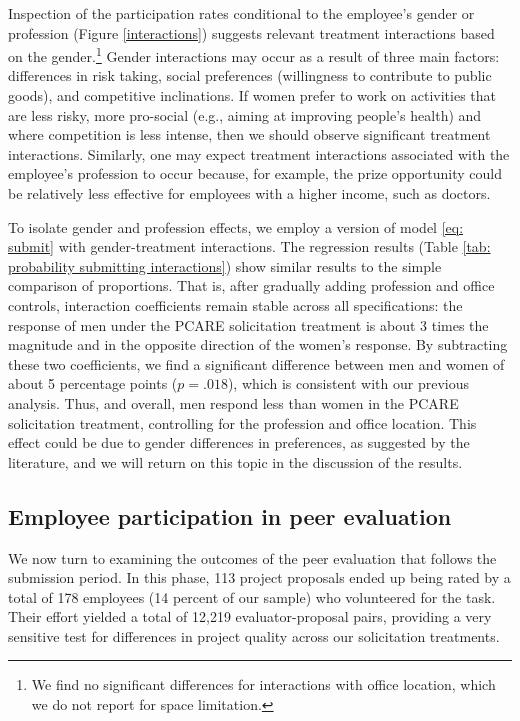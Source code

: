 \documentclass[11pt]{article}
\begin{document}
Inspection of the participation rates conditional to the employee's
gender or profession (Figure \ref{interactions}) suggests relevant
treatment interactions based on the gender.\footnote{We find no
  significant differences for interactions with office location, which
  we do not report for space limitation.} Gender interactions may occur
as a result of three main factors: differences in risk taking, social
preferences (willingness to contribute to public goods), and competitive
inclinations. If women prefer to work on activities that are less risky,
more pro-social (e.g., aiming at improving people's health) and where
competition is less intense, then we should observe significant
treatment interactions. Similarly, one may expect treatment interactions
associated with the employee's profession to occur because, for example,
the prize opportunity could be relatively less effective for employees
with a higher income, such as doctors.



To isolate gender and profession effects, we employ a version of model
\eqref{eq: submit} with gender-treatment interactions. The regression
results (Table \ref{tab: probability submitting interactions}) show
similar results to the simple comparison of proportions. That is, after
gradually adding profession and office controls, interaction
coefficients remain stable across all specifications: the response of
men under the PCARE solicitation treatment is about 3 times the
magnitude and in the opposite direction of the women's response. By
subtracting these two coefficients, we find a significant difference
between men and women of about 5 percentage points (\(p=.018\)), which
is consistent with our previous analysis. Thus, and overall, men respond
less than women in the PCARE solicitation treatment, controlling for the
profession and office location. This effect could be due to gender
differences in preferences, as suggested by the literature, and we will
return on this topic in the discussion of the results.

\subsection{Employee participation in peer
evaluation}\label{employee-participation-in-peer-evaluation}

We now turn to examining the outcomes of the peer evaluation that
follows the submission period. In this phase, 113 project proposals
ended up being rated by a total of 178 employees (14 percent of our
sample) who volunteered for the task. Their effort yielded a total of
12,219 evaluator-proposal pairs, providing a very sensitive test for
differences in project quality across our solicitation treatments.
\end{document}

